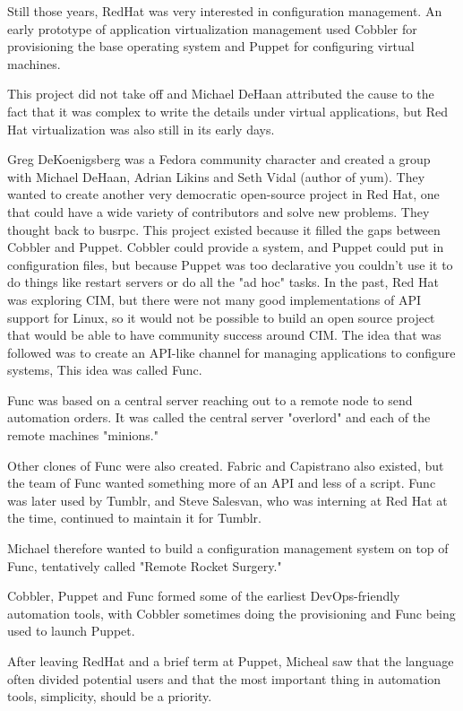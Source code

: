 \documentclass[12pt,a4paper,openright,twoside]{book}
\begin{document}
Still those years, RedHat was very interested in configuration management. An early prototype of application virtualization management used Cobbler for provisioning the base operating system and Puppet for configuring virtual machines.


This project did not take off and Michael DeHaan attributed the cause to the fact that it was complex to write the details under virtual applications, but Red Hat virtualization was also still in its early days.


Greg DeKoenigsberg was a Fedora community character and created a group with Michael DeHaan, Adrian Likins and Seth Vidal (author of yum). They wanted to create another very democratic open-source project in Red Hat, one that could have a wide variety of contributors and solve new problems. They thought back to busrpc. This project existed because it filled the gaps between Cobbler and Puppet. Cobbler could provide a system, and Puppet could put in configuration files, but because Puppet was too declarative you couldn't use it to do things like restart servers or do all the "ad hoc" tasks. In the past, Red Hat was exploring CIM, but there were not many good implementations of API support for Linux, so it would not be possible to build an open source project that would be able to have community success around CIM. The idea that was followed was to create an API-like channel for managing applications to configure systems, This idea was called Func.


Func was based on a central server reaching out to a remote node to send automation orders. It was called the central server "overlord" and each of the remote machines "minions." 


Other clones of Func were also created. Fabric and Capistrano also existed, but the team of Func wanted something more of an API and less of a script. Func was later used by Tumblr, and Steve Salesvan, who was interning at Red Hat at the time, continued to maintain it for Tumblr.


Michael therefore wanted to build a configuration management system on top of Func, tentatively called "Remote Rocket Surgery."


Cobbler, Puppet and Func formed some of the earliest DevOps-friendly automation tools, with Cobbler sometimes doing the provisioning and Func being used to launch Puppet.


After leaving RedHat and a brief term at Puppet, Micheal saw that the language often divided potential users and that the most important thing in automation tools, simplicity, should be a priority.
\end{document}
